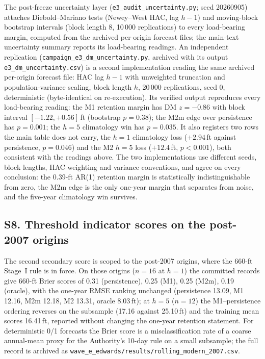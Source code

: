\documentclass[11pt]{article}
\begin{document}
The post-freeze uncertainty layer (\texttt{e3\_audit\_uncertainty.py}; seed 20260905) attaches Diebold--Mariano tests (Newey--West HAC, lag $h-1$) and moving-block bootstrap intervals (block length 8, 10\,000 replications) to every load-bearing margin, computed from the archived per-origin forecast files; the main-text uncertainty summary reports its load-bearing readings. An independent replication (\texttt{campaign\_e3\_dm\_uncertainty.py}, archived with its output \texttt{e3\_dm\_uncertainty.csv}) is a second implementation reading the same archived per-origin forecast file: HAC lag $h-1$ with unweighted truncation and population-variance scaling, block length $h$, 20\,000 replications, seed 0, deterministic (byte-identical on re-execution). Its verified output reproduces every load-bearing reading: the M1 retention margin has DM $z=-0.86$ with block interval $[-1.22,+0.56]$\,ft (bootstrap $p=0.38$); the M2m edge over persistence has $p=0.001$; the $h=5$ climatology win has $p=0.035$. It also registers two rows the main table does not carry, the $h=1$ climatology loss ($+2.94$\,ft against persistence, $p=0.046$) and the M2 $h=5$ loss ($+12.4$\,ft, $p<0.001$), both consistent with the readings above. The two implementations use different seeds, block lengths, HAC weighting and variance conventions, and agree on every conclusion: the 0.39-ft AR(1) retention margin is statistically indistinguishable from zero, the M2m edge is the only one-year margin that separates from noise, and the five-year climatology win survives.

\subsection{S8. Threshold indicator scores on the post-2007 origins}\label{si:edwbrier}

The second secondary score is scoped to the post-2007 origins, where the 660-ft Stage~I rule is in force. On those origins ($n=16$ at $h=1$) the committed records give 660-ft Brier scores of 0.31 (persistence), 0.25 (M1), 0.25 (M2m), 0.19 (oracle), with the one-year RMSE ranking unchanged (persistence 13.09, M1 12.16, M2m 12.18, M2 13.31, oracle 8.03\,ft); at $h=5$ ($n=12$) the M1--persistence ordering reverses on the subsample (17.16 against 25.10\,ft) and the training mean scores 16.41\,ft, reported without changing the one-year retention statement. For deterministic 0/1 forecasts the Brier score is a misclassification rate of a coarse annual-mean proxy for the Authority's 10-day rule on a small subsample; the full record is archived as \texttt{wave\_e\_edwards/results/rolling\_modern\_2007.csv}.
\end{document}
